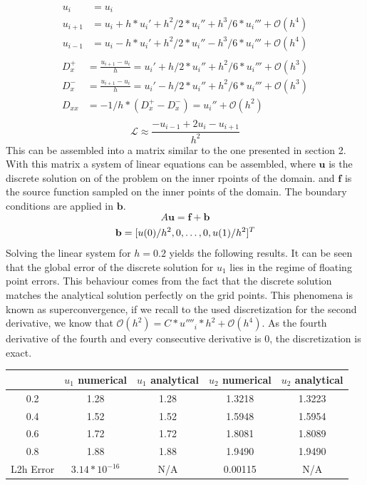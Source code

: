 \documentclass{article}
\begin{document}
\begin{align}
    u_i &= u_i\\
    u_{i+1} &= u_i + h * u_i' + h^2/2 * u_i'' + h^3/6 * u_i''' + \mathcal{O}\left(h^4\right)\\
    u_{i-1} &= u_i - h * u_i' + h^2/2 * u_i'' - h^3/6 * u_i''' + \mathcal{O}\left(h^4\right)\\
\end{align}
\begin{align}
    D_x^+ &= \frac{u_{i+1}-u_i}{h} = u_i' + h/2 * u_i'' + h^2/6 * u_i''' + \mathcal{O}\left(h^3\right)\\
    D_x^- &= \frac{u_{i+1}-u_i}{h} = u_i' - h/2 * u_i'' + h^2/6 * u_i''' + \mathcal{O}\left(h^3\right)\\
    D_{xx} &= -1/h*\left(D_x^+ - D_x^-\right) = u_i'' + \mathcal{O}\left(h^2\right)\\
\end{align}
\begin{equation}
    \mathcal{L} \approx \frac{-u_{i-1}+2u_i-u_{i+1}}{h^2}
\end{equation}
This can be assembled into a matrix similar to the one presented in section 2. With this matrix a system of linear equations can be assembled, where $\mathbf{u}$ is the discrete solution on of the problem on the inner rpoints of the domain. and $\mathbf{f}$ is the source function sampled on the inner points of the domain. The boundary conditions are applied in $\mathbf{b}$.
\begin{equation}
    A\mathbf{u} = \mathbf{f}+\mathbf{b}
\end{equation}
\begin{equation}
    \mathbf{b} = [u(0)/h^2, 0, \dots, 0, u(1)/h^2]^T\\
\end{equation}
Solving the linear system for $h=0.2$ yields the following results. It can be seen that the global error of the discrete solution for $u_1$ lies in the regime of floating point errors. This behaviour comes from the fact that the discrete solution matches the analytical solution perfectly on the grid points. This phenomena is known as superconvergence, if we recall to the used discretization for the second derivative, we know that $\mathcal{O}(h^2) = C*u''''_i*h^2 + \mathcal{O}(h^4)$. As the fourth derivative of the fourth and every consecutive derivative is 0, the discretization is exact.
\begin{table}[H]
    \centering
    \begin{tabular}{c|c|c|c|c}
        & $u_1$ numerical & $u_1$ analytical & $u_2$ numerical & $u_2$ analytical \\ \hline
        0.2 & 1.28 & 1.28 & 1.3218 & 1.3223 \\ \hline
        0.4 & 1.52 & 1.52 & 1.5948 & 1.5954 \\ \hline
        0.6 & 1.72 & 1.72 & 1.8081 & 1.8089 \\ \hline
        0.8 & 1.88 & 1.88 & 1.9490 & 1.9490 \\ \hline
        L2h Error& $3.14 * 10^{-16}$ & N/A &0.00115 & N/A
        
    \end{tabular}
\end{table}
\end{document}
